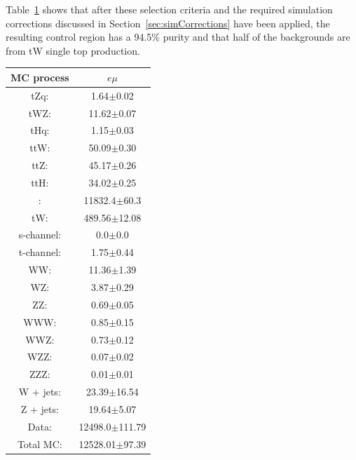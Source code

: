 Table~\ref{tab:ttbarCR} shows that after these selection criteria and the required simulation corrections discussed in Section~\ref{sec:simCorrections} have been applied, the resulting control region has a 94.5\% purity and that half of the backgrounds are from tW single top production.
\begin{table}[htbp]
\label{tab:ttbarCR}
  \centering
 \begin{tabular}{cc}
   \hline
   \textbf{MC process} & \textbf{$e\mu$}  \\
   \hline
	tZq\@: & 1.64$\pm$0.02  \\
	tWZ\@: & 11.62$\pm$0.07  \\
	tHq\@: & 1.15$\pm$0.03  \\
	ttW\@: & 50.09$\pm$0.30   \\
	ttZ\@: & 45.17$\pm$0.26   \\
	ttH\@: & 34.02$\pm$0.25  \\
	\ttbar: & 11832.4$\pm$60.3   \\
	tW\@: & 489.56$\pm$12.08   \\
	s-channel\@: &  0.0$\pm$0.0 \\
	t-channel\@: & 1.75$\pm$0.44 \\
	WW\@: & 11.36$\pm$1.39  \\
	WZ\@: & 3.87$\pm$0.29 \\
	ZZ\@: & 0.69$\pm$0.05 \\
	WWW\@: & 0.85$\pm$0.15     \\
	WWZ\@: & 0.73$\pm$0.12     \\
	WZZ\@: & 0.07$\pm$0.02     \\
	ZZZ\@: & 0.01$\pm$0.01     \\
	W + jets\@: & 23.39$\pm$16.54     \\
	Z + jets\@: & 19.64$\pm$5.07     \\
	\hline
	\hline
	Data\@: & 12498.0$\pm$111.79     \\
	\hline
	Total MC\@: & 12528.01$\pm$97.39     \\
   \hline
 \end{tabular}
\end{table}


